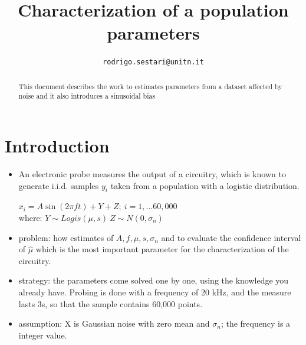 \documentclass[conference]{IEEEtran}
\begin{document}
\title{Characterization of a population parameters}

\author{
	\texttt{rodrigo.sestari@unitn.it}
}

\maketitle

\begin{abstract}
This document describes the work to estimates parameters from a dataset affected by noise and it also introduces a sinusoidal bias
\end{abstract}

\acresetall

\section{Introduction}
\label{sec:introduction}

\begin{itemize}
\item An electronic probe measures the output of a circuitry, which is known to generate i.i.d. samples \begin{math} y_i \end{math} taken from a population with a logistic distribution. 
\bigskip
\begin{center}\begin{math} x_i = A\sin\left(2\pi ft \right) + Y  +Z;  \ i =1,...60,000 \end{math}  \\
where: \begin{math} Y \sim  Logis(\mu,s) \ Z \sim N(0,\sigma_{n} )\end{math}  \end{center}
\bigskip
\item problem: how  estimates of \begin{math}
	A, f , \mu , s, \sigma_n
\end{math} and to evaluate the confidence interval of \begin{math}
	 \hat{\mu}
\end{math}   which is the most important parameter for the characterization of the circuitry.
\bigskip
\item strategy: the parameters come solved one by one,  using the knowledge you already have. Probing is done with a frequency of 20 kHz, and the measure lasts 3s, so that the sample contains 60,000 points.
\bigskip
\item assumption: X is Gaussian noise with zero mean and \begin{math} \sigma_{n} \end{math}; the frequency is a integer value.
\end{itemize}
\bigskip
\end{document}
